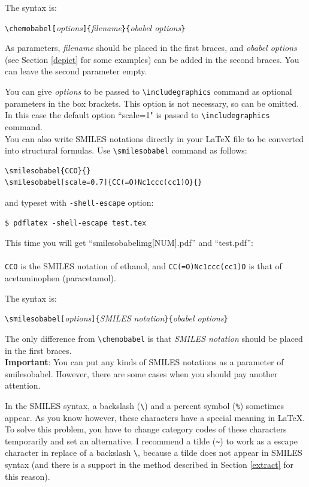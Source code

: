 \documentclass[12pt]{jsarticle}
\begin{document}
The syntax is:
\begin{center}
\verb|\chemobabel[|\textit{options}\verb|]{|\textit{filename}\verb|}{|\textit{obabel options}\verb|}|
\end{center}
As parameters, \textit{filename} should be placed in the first braces, and \textit{obabel options} (see Section \ref{depict} for some examples) can be added in the second braces.
You can leave the second parameter empty.

You can give \textit{options} to be passed to \verb|\includegraphics| command as optional parameters in the box brackets.
This option is not necessary, so can be omitted. In this case the default option ``scale=1" is passed to \verb|\includegraphics| command. \\

You can also write SMILES notations directly in your {\LaTeX} file to be converted into structural formulas.
Use \verb|\smilesobabel| command as follows:
\begin{verbatim}
\smilesobabel{CCO}{}
\smilesobabel[scale=0.7]{CC(=O)Nc1ccc(cc1)O}{}
\end{verbatim}
and typeset with \verb|-shell-escape| option:
\begin{verbatim}
$ pdflatex -shell-escape test.tex
\end{verbatim}
This time you will get ``smilesobabelimg[NUM].pdf'' and ``test.pdf'': \\
 \\
\verb|CCO| is the SMILES notation of ethanol, and \verb|CC(=O)Nc1ccc(cc1)O| is that of acetaminophen (paracetamol).

The syntax is:
\begin{center}
\verb|\smilesobabel[|\textit{options}\verb|]{|\textit{SMILES notation}\verb|}{|\textit{obabel options}\verb|}|
\end{center}
The only difference from \verb|\chemobabel| is that \textit{SMILES notation} should be placed in the first braces. \\

\noindent \textbf{Important}:
You can put any kinds of SMILES notations as a parameter of \textsf{smilesobabel}. However, there are some cases when you should pay another attention.

In the SMILES syntax, a backslash (\verb|\|) and a percent symbol (\verb|%|) sometimes appear.
As you know however, these characters have a special meaning in {\LaTeX}.
To solve this problem, you have to change category codes of these characters temporarily and set an alternative.
I recommend a tilde (\verb|~|) to work as a escape character in replace of a backslash \verb|\|, because a tilde does not appear in SMILES syntax (and there is a support in the method described in Section \ref{extract} for this reason).
\end{document}
